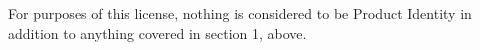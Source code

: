 \documentclass{tufte-handout}
\begin{document}
\begin{fullwidth}
\begin{enumerate}
\end{enumerate}

\noindent For purposes of this license, nothing is considered to be
Product Identity in addition to anything covered in section 1, above.

\end{fullwidth}

\nobibliography{}
\end{document}
